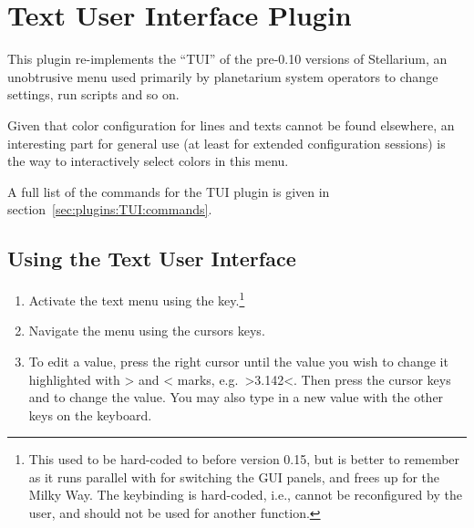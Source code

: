 \newpage

\section{Text User Interface Plugin}
\label{sec:plugins:TextUserInterface}


This plugin re-implements the ``TUI'' of the pre-0.10 versions of
Stellarium, an unobtrusive menu used primarily by planetarium system
operators to change settings, run scripts and so on.

Given that color configuration for lines and texts cannot be found
elsewhere, an interesting part for general use (at least for extended
configuration sessions) is the way to interactively select colors in
this menu.

A full list of the commands for the TUI plugin is
given in section~\ref{sec:plugins:TUI:commands}. 

\subsection{Using the Text User Interface}
\label{sec:plugins:TUI:using}

\begin{enumerate}
\item Activate the text menu using the  key.\footnote{This
    used to be hard-coded to  before version 0.15, but
     is better to remember as it runs parallel with
     for switching the GUI panels, and frees up 
    for the Milky Way. The  keybinding is hard-coded, i.e.,
    cannot be reconfigured by the user, and should not be used for
    another function.}
\item
  Navigate the menu using the cursors keys.
\item
  To edit a value, press the right cursor until the value you wish to
  change it highlighted with \textgreater{} and \textless{} marks, e.g.\
  \textgreater{}3.142\textless{}. Then press the cursor keys \keys{\arrowkeyup} and \keys{\arrowkeydown} to
  change the value. You may also type in a new value with the other keys
  on the keyboard.
\end{enumerate}


